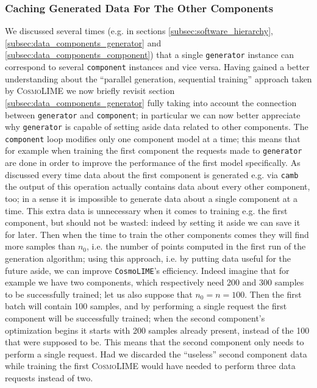\subsubsection{Caching Generated Data For The Other Components}
We discussed several times (e.g. in sections \ref{subsec:software_hierarchy}, \ref{subsec:data_components_generator} and \ref{subsec:data_components_component}) that a single \texttt{generator} instance can correspond to several \texttt{component} instances and vice versa. Having gained a better understanding about the ``parallel generation, sequential training'' approach taken by \textsc{CosmoLIME} we now briefly revisit section \ref{subsec:data_components_generator} fully taking into account the connection between \texttt{generator} and \texttt{component}; in particular we can now better appreciate why \texttt{generator} is capable of setting aside data related to other components. 
The \texttt{component} loop modifies only one component model at a time; this means that for example when training the first component the requests made to \texttt{generator} are done in order to improve the performance of the first model specifically. As discussed every time data about the first component is generated e.g. via \texttt{camb} the output of this operation actually contains data about every other component, too; in a sense it is impossible to generate data about a single component at a time. This extra data is unnecessary when it comes to training e.g. the first component, but should not be wasted: indeed by setting it aside we can save it for later. Then when the time to train the other components comes they will find more samples than $n_0$, i.e. the number of points computed in the first run of the generation algorithm; using this approach, i.e. by putting data useful for the future aside, we can improve \texttt{CosmoLIME}'s efficiency. Indeed imagine that for example we have two components, which respectively need 200 and 300 samples to be successfully trained; let us also suppose that $n_0 = n = 100$. Then the first batch will contain 100 samples, and by performing a single request the first component will be successfully trained; when the second component's optimization begins it starts with 200 samples already present, instead of the 100 that were supposed to be. This means that the second component only needs to perform a single request. Had we discarded the ``useless'' second component data while training the first \textsc{CosmoLIME} would have needed to perform three data requests instead of two.

